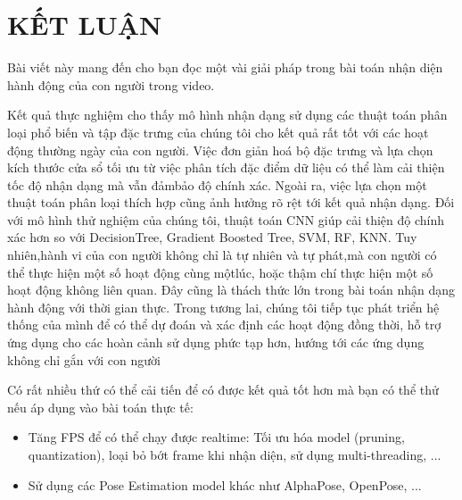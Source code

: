\chapter*{KẾT LUẬN}

\label{Chapter5}

Bài viết này mang đến cho bạn đọc một vài giải pháp trong bài toán nhận diện hành động của con người trong video.

Kết quả thực nghiệm cho thấy mô hình nhận dạng sử dụng các thuật toán phân loại phổ biến và tập đặc trưng của chúng tôi cho kết quả rất tốt với các hoạt động thường ngày của con người. Việc đơn giản hoá bộ đặc trưng và lựa chọn kích thước cửa sổ tối ưu từ việc phân tích đặc điểm dữ liệu có thể làm cải thiện tốc độ nhận dạng mà vẫn đảmbảo độ chính xác. Ngoài ra, việc lựa chọn một thuật toán phân loại thích hợp cũng ảnh hưởng rõ rệt tới kết quả nhận dạng. Đối với mô hình thử nghiệm của chúng tôi, thuật toán CNN giúp cải thiện độ chính xác hơn so với DecisionTree, Gradient Boosted Tree, SVM, RF, KNN. Tuy nhiên,hành vi của con người không chỉ là tự nhiên và tự phát,mà con người có thể thực hiện một số hoạt động cùng mộtlúc, hoặc thậm chí thực hiện một số hoạt động không liên quan. Đây cũng là thách thức lớn trong bài toán nhận dạng hành động với thời gian thực. Trong tương lai, chúng tôi tiếp tục phát triển hệ thống của mình để có thể dự đoán và xác định các hoạt động đồng thời, hỗ trợ ứng dụng cho các hoàn cảnh sử dụng phức tạp hơn, hướng tới các ứng dụng không chỉ gắn với con người 

Có rất nhiều thứ có thể cải tiến để có được kết quả tốt hơn mà bạn có thể thử nếu áp dụng vào bài toán thực tế:
\begin{itemize}
    \item Tăng FPS để có thể chạy được realtime: Tối ưu hóa model (pruning, quantization), loại bỏ bớt frame khi nhận diện, sử dụng multi-threading, ...
    \item Sử dụng các Pose Estimation model khác như AlphaPose, OpenPose, ...
\end{itemize}




